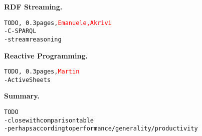 \textbf{RDF Streaming.}
\begin{alltt}TODO\scriptsize, ~0.3 pages, \textcolor{red}{Emanuele, Akrivi}
- C-SPARQL \cite{barbieri_et_al_2009}
- stream reasoning
\end{alltt}

\textbf{Reactive Programming.}
\begin{alltt}TODO\scriptsize, ~0.3 pages, \textcolor{red}{Martin}
- ActiveSheets \cite{vaziri_et_al_2014}
\end{alltt}

\textbf{Summary.}
\begin{alltt}TODO\scriptsize
- close with comparison table
- perhaps according to performance/generality/productivity
\end{alltt}
